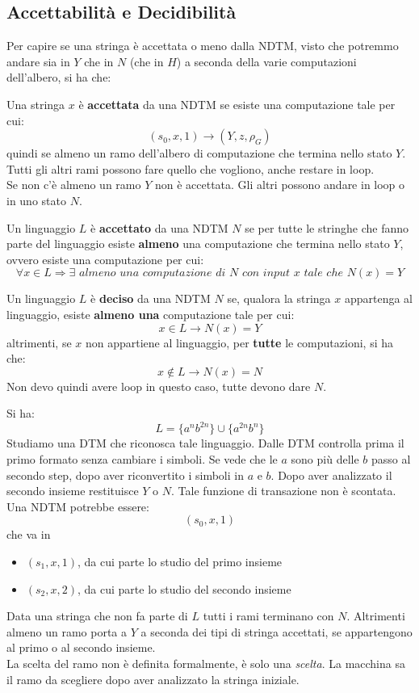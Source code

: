 \subsection{Accettabilità e Decidibilità}
Per capire se una stringa è accettata o meno dalla NDTM, visto che  potremmo andare
sia in $Y$ che in $N$ (che in $H$) a seconda della varie computazioni
dell'albero, si ha che:
\begin{definizione}
  Una stringa $x$ è \textbf{accettata} da una NDTM se esiste una computazione
  tale per cui:
  \[(s_0,x,1)\to(Y, z, \rho_G)\]
  quindi se almeno un ramo dell'albero di computazione che termina nello stato
  $Y$. Tutti gli altri rami possono fare quello che vogliono, anche restare in
  loop.\\
  Se non c'è almeno un ramo $Y$ non è accettata. Gli altri possono andare in
  loop o in uno stato $N$.
\end{definizione}
\begin{definizione}
  Un linguaggio $L$ è \textbf{accettato} da una NDTM $N$ se per tutte le
  stringhe che fanno parte del linguaggio esiste \textbf{almeno} una computazione che
  termina nello stato $Y$, ovvero esiste una computazione per cui:
  \[\forall x\in L\Rightarrow \exists\,\,almeno\,\, una\,\, computazione\,\, di\,\, N\,\, con\,\, \textit{input}\,\, x\,\, tale\,\, che\,\, N(x)=Y\]
\end{definizione}
\begin{definizione}
  Un linguaggio $L$ è \textbf{deciso} da una NDTM $N$ se, qualora la stringa $x$
  appartenga al linguaggio, esiste \textbf{almeno una} computazione tale per
  cui: 
  \[x\in L\rightarrow N(x)=Y\]
  altrimenti, se $x$ non appartiene al linguaggio, per \textbf{tutte} le
  computazioni, si ha che: 
  \[x\not\in L \rightarrow N(x)=N\]
  Non devo quindi avere loop in questo caso, tutte devono dare $N$.
\end{definizione}
\begin{esempio}
  Si ha:
  \[L=\{a^nb^{2n}\}\cup\{a^{2n}b^n\}\]
  Studiamo una DTM che riconosca tale linguaggio. Dalle DTM controlla prima il
  primo formato senza cambiare i simboli. Se vede che le $a$ sono più delle $b$
  passo al secondo step, dopo aver riconvertito i simboli in $a$ e $b$. Dopo
  aver analizzato il secondo insieme restituisce $Y$ o $N$. Tale funzione di
  transazione non è scontata.\\
  Una NDTM potrebbe essere:
  \[(s_0,x,1)\]
  che va in
  \begin{itemize}
    \item $(s_1,x,1)$, da cui parte lo studio del primo insieme
    \item $(s_2,x,2)$, da cui parte lo studio del secondo insieme
  \end{itemize}
  Data una stringa che non fa parte di $L$ tutti i rami terminano con
  $N$. Altrimenti almeno un ramo porta a $Y$ a seconda dei tipi di stringa
  accettati, se appartengono al primo o al secondo insieme. \\
  La scelta del ramo non è definita formalmente, è solo una \textit{scelta}. La
  macchina sa il ramo da scegliere dopo aver analizzato la stringa iniziale.
\end{esempio}
